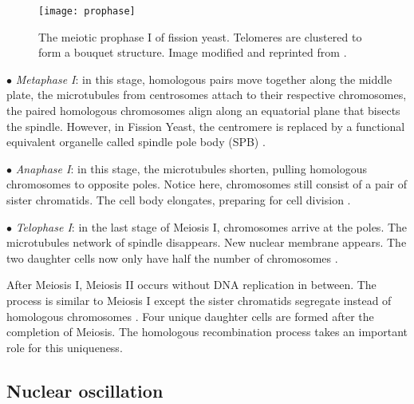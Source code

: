 \begin{figure}[htpb]
    \centering
    \texttt{[image: prophase]}
    \caption{The meiotic prophase I of fission yeast. Telomeres are clustered to form a bouquet structure. Image modified and reprinted from \cite{Asakawa2007}.}
    \label{fig:prophase}
\end{figure}

$\bullet$ \emph{Metaphase I}: in this stage, homologous pairs move together along the middle plate, the microtubules from centrosomes attach to their respective chromosomes, the paired homologous chromosomes align along an equatorial plane that bisects the spindle. However, in Fission Yeast, the centromere is replaced by a functional equivalent organelle called spindle pole body (SPB) \cite{Freeman2008}.

$\bullet$ \emph{Anaphase I}: in this stage, the microtubules shorten, pulling homologous chromosomes to opposite poles. Notice here, chromosomes still consist of a pair of sister chromatids. The cell body elongates, preparing for cell division \cite{Freeman2008}.

$\bullet$ \emph{Telophase I}: in the last stage of Meiosis I, chromosomes arrive at the poles. The microtubules network of spindle disappears. New nuclear membrane appears. The two daughter cells now only have half the number of chromosomes \cite{Freeman2008}.

After Meiosis I, Meiosis II occurs without DNA replication in between. The process is similar to Meiosis I except the sister chromatids segregate instead of homologous chromosomes \cite{Freeman2008}. Four unique daughter cells are formed after the completion of Meiosis. The homologous recombination process takes an important role for this uniqueness.

\subsection{Nuclear oscillation}
\label{sub:nuclear_oscillation}

